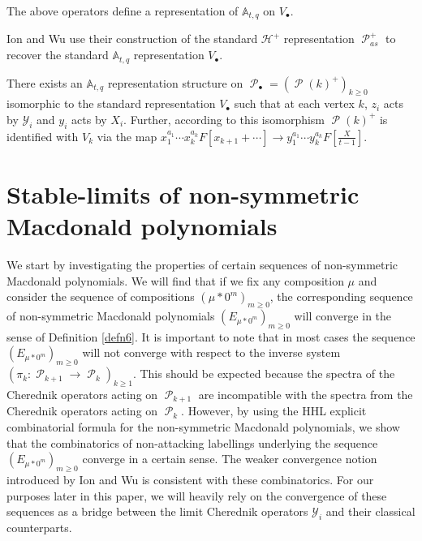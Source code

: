 \documentclass[ALCO,Unicode]{cedram}
\newcommand{\y}{{ \mathscr{Y} }}
\DeclareMathOperator{\sP}{\mathscr{P} }
\begin{document}
\begin{thm}[{\cite[Thm. 7.3]{CM_2015}}]
    The above operators define a representation of $\mathbb{A}_{t,q}$ on $V_{\bullet}.$
\end{thm}


Ion and Wu use their construction of the standard $\mathscr{H}^{+}$ representation $\sP_{as}^{+}$ to recover the standard $\mathbb{A}_{t,q}$ representation $V_{\bullet}.$

\begin{thm}
  There exists an $\mathbb{A}_{t,q}$ representation structure on $\sP_{\bullet} = (\sP(k)^{+})_{k\geq 0}$ isomorphic to the standard representation $V_{\bullet}$ such that at each vertex $k$, $z_i$ acts by $\y_i$ and $y_i$ acts by $X_i$. Further, according to this isomorphism $\sP(k)^{+}$ is identified with $V_k$ via the map $x_1^{a_1}\cdots x_k^{a_k}F[x_{k+1}+ \cdots] \rightarrow y_1^{a_1}\cdots y_k^{a_k}F[\frac{X}{t-1}].$
\end{thm} 

\section{Stable-limits of non-symmetric Macdonald polynomials}\label{stable limits of macD poly}

We start by investigating the properties of certain sequences of non-symmetric Macdonald polynomials. We will find that if we fix any composition $\mu$ and consider the sequence of compositions $(\mu*0^m)_{m\geq 0}$, the corresponding sequence of non-symmetric Macdonald polynomials $(E_{\mu*0^m})_{m\geq 0}$ will converge in the sense of Definition \ref{defn6}. It is important to note that in most cases the sequence $(E_{\mu*0^m})_{m\geq 0}$ will not converge with respect to the inverse system $(\pi_{k}: \sP_{k+1} \rightarrow \sP_{k})_{k\geq 1}$. This should be expected because the spectra of the Cherednik operators acting on $\sP_{k+1}$ are incompatible with the spectra from the Cherednik operators acting on $\sP_{k}$. However, by using the HHL explicit combinatorial formula for the non-symmetric Macdonald polynomials, we show that the combinatorics of non-attacking labellings underlying the sequence $(E_{\mu*0^m})_{m\geq 0}$ converge in a certain sense. The weaker convergence notion introduced by Ion and Wu is consistent with these combinatorics. For our purposes later in this paper, we will heavily rely on the convergence of these sequences as a bridge between the limit Cherednik operators $\y_i$ and their classical counterparts.
 
\end{document}
